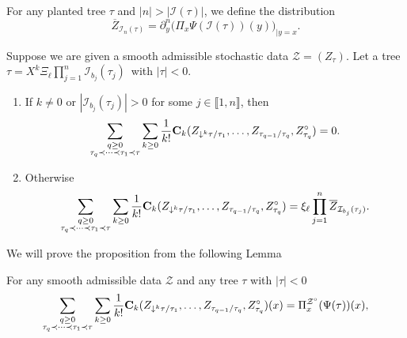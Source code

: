 \documentclass[11pt]{preprint}
\newcommand{\mcI}{\mathcal{I}}
\newcommand{\mcZ}{\mathcal{Z}}
\newcommand{\bbrack}[1]{ \llbracket #1 \rrbracket }
\begin{document}
 For any planted tree $\tau$ and $|n|>|\mcI(\tau)|$, we define the distribution
\begin{equation} \label{eq_defZplusNeg_0}
	\overline Z_{\mcI_{n}(\tau)} = \partial^{n}_y\Big( { \Pi}_x \Psi(\mcI (\tau))(y)\Big)_{|y=x}.
\end{equation}


	\begin{proposition} \label{lem_SumNegativeCorrector}
	Suppose we are given a smooth admissible stochastic data $\mcZ=(Z_\tau)$. Let a tree $\tau= X^k \Xi_\ell \prod_{j=1}^n\mcI_{b_j}(\tau_j) \, $ with $|\tau|<0$.
	\begin{enumerate}
		\item If $k\ne 0$ or $|\mcI_{b_j}(\tau_j)|>0$ for some $j\in\bbrack{1,n}$, then
		\begin{equation}
			\sum_{\substack{q\geq 0 \\ \tau_q\prec\dots\prec\tau_1\prec\tau}}\sum_{k\geq 0} \frac{1}{k!}{\bf C}_k(Z_{\downarrow^k\tau/\tau_1},\dots,Z_{\tau_{q-1}/\tau_q}, Z_{\tau_q}^\circ) = 0.
		\end{equation}
		\item Otherwise 
		\begin{equation}
			\sum_{\substack{q\geq 0 \\ \tau_q\prec\dots\prec\tau_1\prec\tau}}\sum_{k\geq 0} \frac{1}{k!}{\bf C}_k(Z_{\downarrow^k\tau/\tau_1},\dots, Z_{\tau_{q-1}/\tau_q}, Z_{\tau_q}^\circ) = \xi_\ell \prod_{j=1}^n  \overline Z_{\mcI_{b_j}(\tau_j)}.
		\end{equation}
	\end{enumerate}
\end{proposition}
We will prove the proposition from the following Lemma
\begin{lemma}\label{lem_sum Negative_correctors}
	For any smooth admissible data $\mcZ$ and any tree $\tau$ with $|\tau|<0$
	\begin{align*}
		\sum_{\substack{q\geq 0 \\ \tau_q\prec\dots\prec\tau_1\prec\tau}}\sum_{k\geq 0} \frac{1}{k!}{\bf C}_k(Z_{\downarrow^k\tau/\tau_1},\dots,Z_{\tau_{q-1}/\tau_q} ,Z_{\tau_q}^\circ)(x) = { \Pi}_x^{\mcZ^\circ}(\Psi(\tau))(x),
	\end{align*}
\end{lemma}
\end{document}
